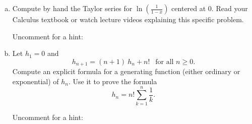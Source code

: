 \documentclass[12pt]{amsart}
\begin{document}
\begin{enumerate}[a.]
\item
Compute by hand the Taylor series for $\ln(\frac{1}{1-x})$ centered at $0$. 
Read your Calculus textbook or watch lecture videos explaining this specific problem.

{\tiny \noindent Uncomment for a hint: }


\item
Let $h_1=0$  and \[h_{n+1}= (n+1) ~h_{n} + n! ~~ \text{ for all $n \geq 0$}. \]
Compute an explicit formula for a generating function (either ordinary or exponential) of $h_n$.
Use it to prove the formula 
\begin{equation*}
h_n = n! \sum_{k=1}^n \frac{1}{k}.
\end{equation*}

{\tiny \noindent Uncomment for a hint: }

\end{enumerate}
\end{document}
